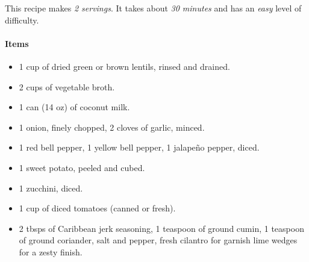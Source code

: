 This recipe makes \emph{2 servings}. It takes about \emph{30 minutes} and has an \emph{easy} level of difficulty. 

\paragraph{Items}
\begin{itemize}[noitemsep]
	\item[\ding{182}] 1 cup of dried green or brown lentils, rinsed and drained.
	\item[\ding{183}] 2 cups of vegetable broth.
	\item[\ding{184}] 1 can (14 oz) of coconut milk.
	\item[\ding{185}] 1 onion, finely chopped, 2 cloves of garlic, minced.
	\item[\ding{186}] 1 red bell pepper, 1 yellow bell pepper, 1 jalapeño pepper, diced.
	\item[\ding{187}] 1 sweet potato, peeled and cubed.
	\item[\ding{188}] 1 zucchini, diced.
	\item[\ding{189}] 1 cup of diced tomatoes (canned or fresh).
	\item[\ding{190}] 2 tbsps of Caribbean jerk seasoning, 1 teaspoon of ground cumin, 1 teaspoon of ground coriander, salt and pepper, fresh cilantro for garnish lime wedges for a zesty finish.
\end{itemize}

